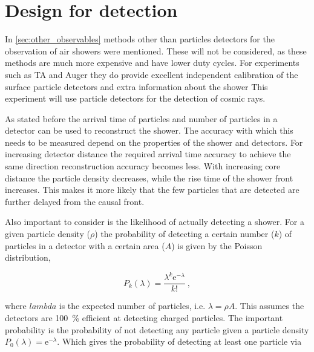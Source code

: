\section{Design for detection}

In \cref{sec:other_observables} methods other than particles detectors for the observation of air showers were mentioned. These will not be considered, as these methods are much more expensive and have lower duty cycles. For experiments such as TA and Auger they do provide excellent independent calibration of the surface particle detectors and extra information about the shower This experiment will use particle detectors for the detection of cosmic rays.

As stated before the arrival time of particles and number of particles in a detector can be used to reconstruct the shower. The accuracy with which this needs to be measured depend on the properties of the shower and detectors. For increasing detector distance the required arrival time accuracy to achieve the same direction reconstruction accuracy becomes less. With increasing core distance the particle density decreases, while the rise time of the shower front increases. This makes it more likely that the few particles that are detected are further delayed from the causal front.

Also important to consider is the likelihood of actually detecting a shower. For a given particle density ($\rho$) the probability of detecting a certain number ($k$) of particles in a detector with a certain area ($A$) is given by the Poisson distribution,

\begin{equation}
    P_k(\lambda) = \frac{\lambda^k \mathrm{e}^{-\lambda}}{k!} \ ,
\end{equation}

where $lambda$ is the expected number of particles, i.e. $\lambda = \rho A$. This assumes the detectors are \SI{100}{\percent} efficient at detecting charged particles. The important probability is the probability of not detecting any particle given a particle density $P_0(\lambda) = \mathrm{e}^{-\lambda}$. Which gives the probability of detecting at least one particle via

